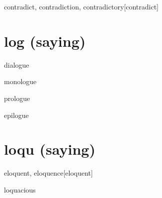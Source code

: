 \begin{wordRef}{contradict, contradiction, contradictory}[contradict]
\end{wordRef}

\section{log (saying)}

\begin{wordRef}{dialogue}
\end{wordRef}

\begin{wordRef}{monologue}
\end{wordRef}

\begin{wordRef}{prologue}
\end{wordRef}

\begin{wordRef}{epilogue}
\end{wordRef}

\section{loqu (saying)}

\begin{wordRef}{eloquent, eloquence}[eloquent]
\end{wordRef}

\begin{wordRef}{loquacious}
\end{wordRef}